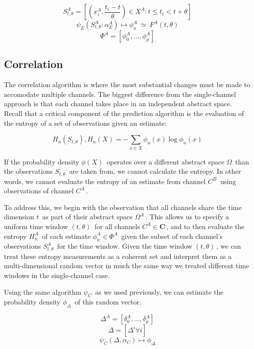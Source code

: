 \documentclass[10pt]{article}
\begin{document}
\begin{equation} S_{t,\theta}^A = \left[ (x_i^A,\frac{t_i - t}{\theta}) \in X^A : t \le t_i < t+\theta \right] \end{equation}
\[ \psi_E( S_{t,\theta}^A:\alpha_E^A ) \mapsto \phi_n^A \ \simeq \ F^A(t,\theta)  \]
\[ \Phi^A = [\phi_0^A,...,\phi_p^A ] \nonumber \]

\subsection{Correlation}
The correlation algorithm is where the most substantial changes must be made to accomodate multiple channels.  The biggest difference from the single-channel approach is that each channel takes place in an independent abstract space.  Recall that a critical component of the prediction algorithm is the evaluation of the entropy of a set of observations given an estimate:

\[ H_n(S_{t,\theta}), H_n(X) = -\sum_{x \in X} \phi_n(x) \log \phi_n(x) \]

If the probability density \(\phi(X) \,\!\) operates over a different abstract space \(\Omega \,\!\) than the observations \(S_{t,\theta} \,\!\) are taken from, we cannot calculate the entropy.  In other words, we cannot evaluate the entropy of an estimate from channel \(C^B \,\!\) using observations of channel \(C^A \,\!\).  

To address this, we begin with the observation that all channels share the time dimension \(t \,\!\) as part of their abstract space \(\Omega^A \,\!\).  This allows us to specify a uniform time window \((t,\theta) \,\!\) for all channels \(C^A \in \mathbf{C} \,\!\), and to then evaluate the entropy \(H_n^A \,\!\) of each estimate \(\phi_n^A \in \Phi^A \,\!\) given the subset of each channel's observations \(S_{t,\theta}^A \,\!\) for the time window.  Given the time window \((t,\theta) \,\!\), we can treat these entropy measurements as a coherent set and interpret them as a multi-dimensional random vector in much the same way we treated different time windows in the single-channel case.

Using the same algorithm \(\psi_C \,\!\) as we used previously, we can estimate the probability density \(\phi_\Delta \,\!\) of this random vector. 

\[ \Delta^A = [\delta_0^A,...,\delta_p^A] \nonumber  \]
\[ \Delta = [\Delta^i \forall i] \nonumber  \]
\begin{equation} \psi_C( \Delta , \alpha_C ) \mapsto \phi_\Delta \end{equation}
\end{document}
